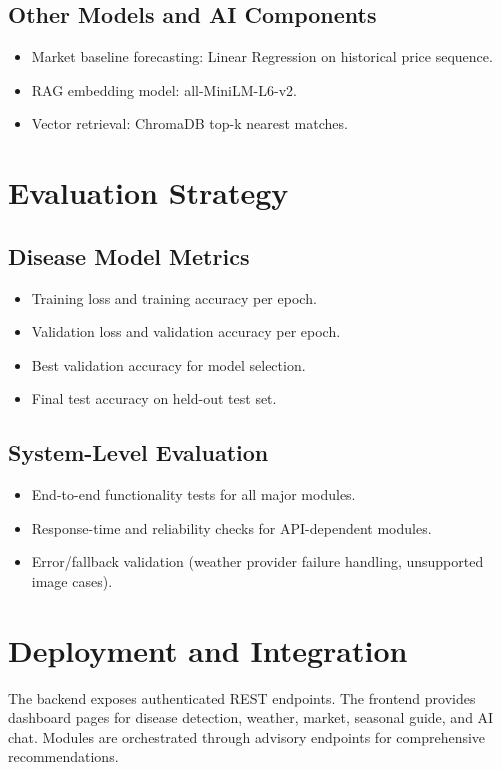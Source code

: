 \documentclass[12pt,a4paper]{report}
\begin{document}
\subsection{Other Models and AI Components}
\begin{itemize}[noitemsep]
    \item Market baseline forecasting: Linear Regression on historical price sequence.
    \item RAG embedding model: all-MiniLM-L6-v2.
    \item Vector retrieval: ChromaDB top-k nearest matches.
\end{itemize}

\section{Evaluation Strategy}
\subsection{Disease Model Metrics}
\begin{itemize}[noitemsep]
    \item Training loss and training accuracy per epoch.
    \item Validation loss and validation accuracy per epoch.
    \item Best validation accuracy for model selection.
    \item Final test accuracy on held-out test set.
\end{itemize}

\subsection{System-Level Evaluation}
\begin{itemize}[noitemsep]
    \item End-to-end functionality tests for all major modules.
    \item Response-time and reliability checks for API-dependent modules.
    \item Error/fallback validation (weather provider failure handling, unsupported image cases).
\end{itemize}

\section{Deployment and Integration}
The backend exposes authenticated REST endpoints. The frontend provides dashboard pages for disease detection, weather, market, seasonal guide, and AI chat. Modules are orchestrated through advisory endpoints for comprehensive recommendations.
\end{document}
